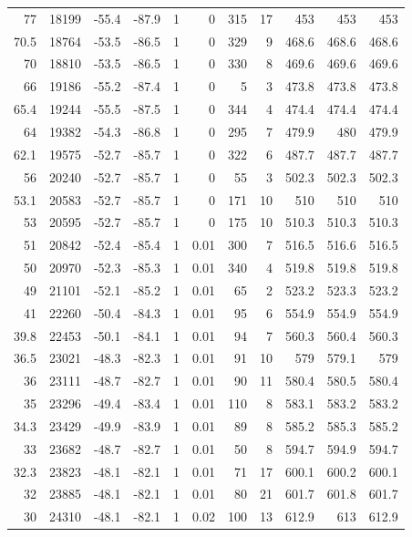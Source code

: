 \documentclass{article}
\begin{document}
\begin{longtable}{r|r|r|r|r|r|r|r|r|r|r}
77 & 18199 & -55.4 & -87.9 & 1 & 0 & 315 & 17 & 453 & 453 & 453 \\
70.5 & 18764 & -53.5 & -86.5 & 1 & 0 & 329 & 9 & 468.6 & 468.6 & 468.6 \\
70 & 18810 & -53.5 & -86.5 & 1 & 0 & 330 & 8 & 469.6 & 469.6 & 469.6 \\
66 & 19186 & -55.2 & -87.4 & 1 & 0 & 5 & 3 & 473.8 & 473.8 & 473.8 \\
65.4 & 19244 & -55.5 & -87.5 & 1 & 0 & 344 & 4 & 474.4 & 474.4 & 474.4 \\
64 & 19382 & -54.3 & -86.8 & 1 & 0 & 295 & 7 & 479.9 & 480 & 479.9 \\
62.1 & 19575 & -52.7 & -85.7 & 1 & 0 & 322 & 6 & 487.7 & 487.7 & 487.7 \\
56 & 20240 & -52.7 & -85.7 & 1 & 0 & 55 & 3 & 502.3 & 502.3 & 502.3 \\
53.1 & 20583 & -52.7 & -85.7 & 1 & 0 & 171 & 10 & 510 & 510 & 510 \\
53 & 20595 & -52.7 & -85.7 & 1 & 0 & 175 & 10 & 510.3 & 510.3 & 510.3 \\
51 & 20842 & -52.4 & -85.4 & 1 & 0.01 & 300 & 7 & 516.5 & 516.6 & 516.5 \\
50 & 20970 & -52.3 & -85.3 & 1 & 0.01 & 340 & 4 & 519.8 & 519.8 & 519.8 \\
49 & 21101 & -52.1 & -85.2 & 1 & 0.01 & 65 & 2 & 523.2 & 523.3 & 523.2 \\
41 & 22260 & -50.4 & -84.3 & 1 & 0.01 & 95 & 6 & 554.9 & 554.9 & 554.9 \\
39.8 & 22453 & -50.1 & -84.1 & 1 & 0.01 & 94 & 7 & 560.3 & 560.4 & 560.3 \\
36.5 & 23021 & -48.3 & -82.3 & 1 & 0.01 & 91 & 10 & 579 & 579.1 & 579 \\
36 & 23111 & -48.7 & -82.7 & 1 & 0.01 & 90 & 11 & 580.4 & 580.5 & 580.4 \\
35 & 23296 & -49.4 & -83.4 & 1 & 0.01 & 110 & 8 & 583.1 & 583.2 & 583.2 \\
34.3 & 23429 & -49.9 & -83.9 & 1 & 0.01 & 89 & 8 & 585.2 & 585.3 & 585.2 \\
33 & 23682 & -48.7 & -82.7 & 1 & 0.01 & 50 & 8 & 594.7 & 594.9 & 594.7 \\
32.3 & 23823 & -48.1 & -82.1 & 1 & 0.01 & 71 & 17 & 600.1 & 600.2 & 600.1 \\
32 & 23885 & -48.1 & -82.1 & 1 & 0.01 & 80 & 21 & 601.7 & 601.8 & 601.7 \\
30 & 24310 & -48.1 & -82.1 & 1 & 0.02 & 100 & 13 & 612.9 & 613 & 612.9 \\

\end{longtable}
\end{document}
